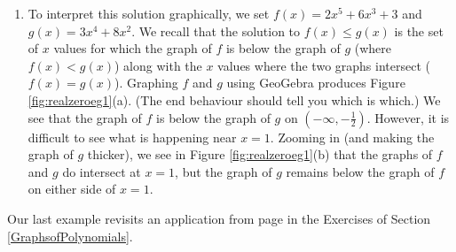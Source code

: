 {\begin{enumerate}
\item To interpret this solution graphically, we set $f(x) = 2x^5+6x^3+3$ and $g(x) = 3x^4+8x^2$.  We recall that the solution to $f(x) \leq g(x)$ is the set of $x$ values for which the graph of $f$ is below the graph of $g$ (where $f(x) < g(x)$) along with the $x$ values where the two graphs intersect ($f(x) = g(x)$).  Graphing $f$ and $g$ using GeoGebra produces Figure \ref{fig:realzeroeg1}(a).  (The end behaviour should tell you which is which.)  We see that the graph of $f$ is below the graph of $g$ on $\left(-\infty, -\frac{1}{2}\right)$. However, it is difficult to see what is happening near $x=1$.  Zooming in (and making the graph of $g$ thicker), we see in Figure \ref{fig:realzeroeg1}(b) that the graphs of $f$ and $g$ do intersect at $x=1$, but the graph of $g$ remains below the graph of $f$ on either side of $x = 1$.

\end{enumerate}
}

{
}


Our last example revisits an application from page \pageref{LCDmaxprofit} in the Exercises of Section \ref{GraphsofPolynomials}.

\medskip


